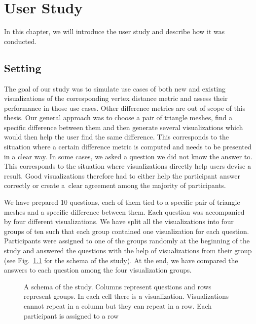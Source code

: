 \chapter{User Study}
\label{chap:user_study}

In this chapter, we will introduce the user study and describe how it was conducted.

\section{Setting}
\label{sec:user_study-setting}

The goal of our study was to simulate use cases of both new and existing visualizations of the corresponding vertex distance metric and assess their performance in those use cases. Other difference metrics are out of scope of this thesis. Our general approach was to choose a pair of triangle meshes, find a specific difference between them and then generate several visualizations which would then help the user find the same difference. This corresponds to the situation where a certain difference metric is computed and needs to be presented in a clear way. In some cases, we asked a question we did not know the answer to. This corresponds to the situation where visualizations directly help users devise a result. Good visualizations therefore had to either help the participant answer correctly or create a~clear agreement among the majority of participants.

We have prepared 10 questions, each of them tied to a specific pair of triangle meshes and a specific difference between them. Each question was accompanied by four different visualizations. We have split all the visualizations into four groups of ten such that each group contained one visualization for each question. Participants were assigned to one of the groups randomly at the beginning of the study and answered the questions with the help of visualizations from their group (see Fig.~\ref{fig:illustration-study_setting} for the schema of the study). At the end, we have compared the answers to each question among the four visualization groups.

\begin{figure}[h]
	\centering
	\def\svgwidth{\textwidth}
	
	\caption[Study setting]{A schema of the study. Columns represent questions and rows represent groups. In each cell there is a visualization. Visualizations cannot repeat in a column but they can repeat in a row. Each participant is assigned to a row}
	\label{fig:illustration-study_setting}
\end{figure}

